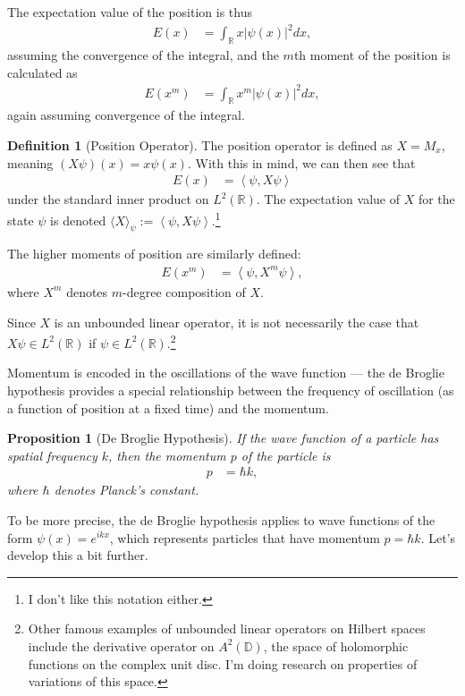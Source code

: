 \documentclass[12pt]{extarticle}
\newcommand{\R}{\mathbb{R}}
\newcommand{\iprod}[2]{\left\langle #1,#2\right\rangle}
\theoremstyle{plain}
\newtheorem*{proposition}{Proposition}%
\theoremstyle{definition}
\newtheorem*{definition}{Definition}
\theoremstyle{remark}
\renewcommand{\newline}{\hfill\break}
\begin{document}
  The expectation value of the position is thus
  \begin{align*}
    E(x) &= \int_{\R}x\left\vert \psi(x) \right\vert^2dx,
  \end{align*}
  assuming the convergence of the integral, and the $m$th moment of the position is calculated as
  \begin{align*}
    E(x^m) &= \int_{\R}x^m\left\vert \psi(x) \right\vert^2dx,
  \end{align*}
  again assuming convergence of the integral.
  \begin{definition}[Position Operator]
    The position operator is defined as $X = M_{x}$, meaning $(X\psi)(x) = x\psi(x)$. With this in mind, we can then see that
    \begin{align*}
      E(x) &= \iprod{\psi}{X\psi}
    \end{align*}
    under the standard inner product on $L^{2}(\R)$. The expectation value of $X$ for the state $\psi$ is denoted $\langle X \rangle_{\psi} := \iprod{\psi}{X\psi}$.\footnote{I don't like this notation either.}\newline

    The higher moments of position are similarly defined:
    \begin{align*}
      E(x^m) &= \iprod{\psi}{X^{m}\psi},
    \end{align*}
    where $X^{m}$ denotes $m$-degree composition of $X$.\newline

    Since $X$ is an unbounded linear operator, it is not necessarily the case that $X\psi \in L^{2}(\R)$ if $\psi\in L^{2}(\R)$.\footnote{Other famous examples of unbounded linear operators on Hilbert spaces include the derivative operator on $A^{2}(\mathbb{D})$, the space of holomorphic functions on the complex unit disc. I'm doing research on properties of variations of this space.}
  \end{definition}
  Momentum is encoded in the oscillations of the wave function --- the de Broglie hypothesis provides a special relationship between the frequency of oscillation (as a function of position at a fixed time) and the momentum.
  \begin{proposition}[De Broglie Hypothesis]
    If the wave function of a particle has spatial frequency $k$, then the momentum $p$ of the particle is
    \begin{align*}
      p &= \hbar k,
    \end{align*}
    where $\hbar$ denotes Planck's constant.
  \end{proposition}
  To be more precise, the de Broglie hypothesis applies to wave functions of the form $\psi(x) = e^{ikx}$, which represents particles that have momentum $p = \hbar k$. Let's develop this a bit further.\newline
\end{document}
